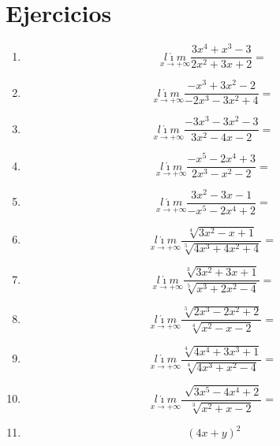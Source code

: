 \documentclass[oneside,spanish,letter]{article}
\begin{document}
\section{Ejercicios}
\begin{enumerate}
 \item $$\underset{x\rightarrow +\infty}{l\acute{\imath}m} \frac{3x^4+x^3-3}{2x^2+3x+2}=$$
 \item $$\underset{x\rightarrow +\infty}{l\acute{\imath}m} \frac{-x^3+3x^2-2}{-2x^3-3x^2+4}=$$
 \item $$\underset{x\rightarrow +\infty}{l\acute{\imath}m} \frac{-3x^3-3x^2-3}{3x^2-4x-2}=$$
 \item $$\underset{x\rightarrow +\infty}{l\acute{\imath}m} \frac{-x^5-2x^4+3}{2x^3-x^2-2}=$$
 \item $$\underset{x\rightarrow +\infty}{l\acute{\imath}m} \frac{3x^2-3x-1}{-x^5-2x^4+2}=$$
 \item $$\underset{x\rightarrow +\infty}{l\acute{\imath}m} \frac{\sqrt[4]{3x^2-x+1}}{\sqrt[5]{4x^3+4x^2+4}}=$$
 \item $$\underset{x\rightarrow +\infty}{l\acute{\imath}m} \frac{\sqrt[3]{3x^2+3x+1}}{\sqrt[5]{x^3+2x^2-4}}=$$
 \item $$\underset{x\rightarrow +\infty}{l\acute{\imath}m} \frac{\sqrt[5]{2x^3-2x^2+2}}{\sqrt[4]{x^2-x-2}}=$$
 \item $$\underset{x\rightarrow +\infty}{l\acute{\imath}m} \frac{\sqrt[4]{4x^4+3x^3+1}}{\sqrt[4]{4x^3+x^2-4}}=$$
 \item $$\underset{x\rightarrow +\infty}{l\acute{\imath}m} \frac{\sqrt[]{3x^5-4x^4+2}}{\sqrt[3]{x^2+x-2}}=$$
\item $$(4x+y)^2$$
 \end{enumerate}
  \newpage
\end{document}
